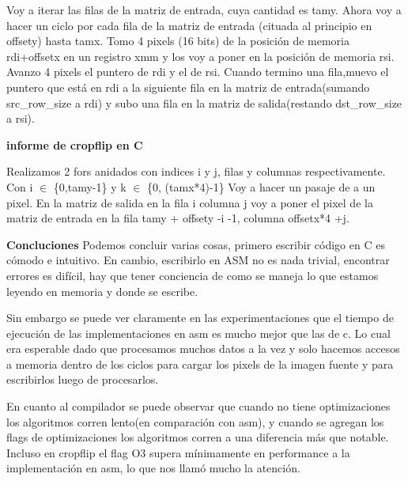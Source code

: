 \documentclass{article}
\begin{document}
Voy a iterar las filas de la matriz de entrada, cuya cantidad es tamy.\newline
Ahora voy a hacer un ciclo por cada fila de la matriz de entrada (cituada al principio en offsety) hasta tamx.\newline
Tomo 4 pixels (16 bits) de la posición de memoria rdi+offsetx en un registro xmm y los voy a poner en la posición de memoria rsi.\newline
Avanzo 4 pixels el puntero de rdi y el de rsi. \newline
Cuando termino una fila,muevo el puntero que está en rdi a la siguiente fila en la matriz de entrada(sumando src\_row\_size a rdi) y subo una fila en la matriz de salida(restando dst\_row\_size a rsi).\newline

\textbf{informe de cropflip en C} \newline

Realizamos 2 fors anidados con indices i y j, filas y columnas respectivamente. Con i $\in$ \{0,tamy-1\} y k $\in$ \{0, (tamx*4)-1\} \newline
Voy a hacer un pasaje de a un pixel.
En la matriz de salida en la fila i columna j voy a poner el pixel de la matriz de entrada en la fila tamy + offsety -i -1, columna offsetx*4 +j. 
\newline

\textbf{Concluciones}\newline
Podemos concluir varias cosas, primero escribir código en C es cómodo e intuitivo. En cambio, escribirlo en ASM no es nada trivial, encontrar errores es difícil, hay que tener conciencia de como se maneja lo que estamos leyendo en memoria y donde se escribe.

Sin embargo se puede ver claramente en las experimentaciones  que el tiempo de ejecución de las implementaciones en asm es mucho mejor que las de c.
Lo cual era esperable dado que procesamos muchos datos a la vez y solo hacemos accesos a memoria dentro de
los ciclos para cargar los pixels de la imagen fuente y para escribirlos luego de procesarlos.

En cuanto al compilador se puede observar que cuando no tiene optimizaciones los algoritmos corren lento(en comparación con asm), y cuando se agregan los flags de optimizaciones los algoritmos corren a una diferencia más que notable. \newline
Incluso en cropflip el flag O3 supera mínimamente en performance a la implementación en asm, lo que nos llamó mucho la atención. 
\end{document}
